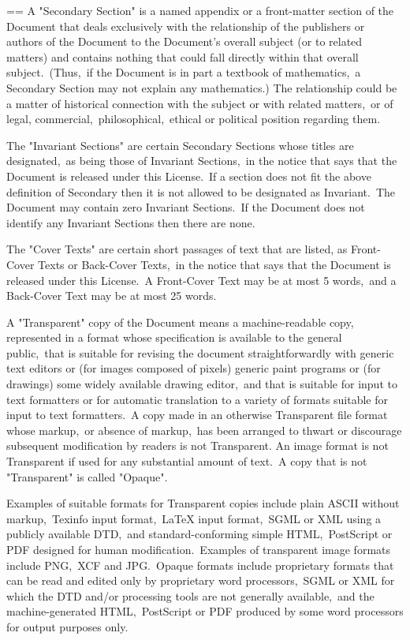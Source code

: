 \documentclass{book}
\makeatletter
\newenvironment{Texinfopreformatted}{%
  \par\GNUTobeylines\obeyspaces\frenchspacing\parskip=\z@\parindent=\z@}{}
{\catcode`\^^M=13 \gdef\GNUTobeylines{\catcode`\^^M=13 \def^^M{\null\par}}}
\newenvironment{Texinfoindented}{\begin{list}{}{}\item\relax}{\end{list}}
\renewcommand{\_}{\Texinfounderscore\discretionary{}{}{}}
\makeatother
\begin{document}
\begin{Texinfoindented}
\begin{Texinfopreformatted}
A "Secondary Section" is a named appendix or a front-matter section of
the Document that deals exclusively with the relationship of the
publishers or authors of the Document to the Document's overall
subject (or to related matters) and contains nothing that could fall
directly within that overall subject.\  (Thus,\ if the Document is in
part a textbook of mathematics,\ a Secondary Section may not explain
any mathematics.)  The relationship could be a matter of historical
connection with the subject or with related matters,\ or of legal,
commercial,\ philosophical,\ ethical or political position regarding
them.

The "Invariant Sections" are certain Secondary Sections whose titles
are designated,\ as being those of Invariant Sections,\ in the notice
that says that the Document is released under this License.\  If a
section does not fit the above definition of Secondary then it is not
allowed to be designated as Invariant.\  The Document may contain zero
Invariant Sections.\  If the Document does not identify any Invariant
Sections then there are none.

The "Cover Texts" are certain short passages of text that are listed,
as Front-Cover Texts or Back-Cover Texts,\ in the notice that says that
the Document is released under this License.\  A Front-Cover Text may
be at most 5 words,\ and a Back-Cover Text may be at most 25 words.

A "Transparent" copy of the Document means a machine-readable copy,
represented in a format whose specification is available to the
general public,\ that is suitable for revising the document
straightforwardly with generic text editors or (for images composed of
pixels) generic paint programs or (for drawings) some widely available
drawing editor,\ and that is suitable for input to text formatters or
for automatic translation to a variety of formats suitable for input
to text formatters.\  A copy made in an otherwise Transparent file
format whose markup,\ or absence of markup,\ has been arranged to thwart
or discourage subsequent modification by readers is not Transparent.
An image format is not Transparent if used for any substantial amount
of text.\  A copy that is not "Transparent" is called "Opaque".

Examples of suitable formats for Transparent copies include plain
ASCII without markup,\ Texinfo input format,\ LaTeX input format,\ SGML
or XML using a publicly available DTD,\ and standard-conforming simple
HTML,\ PostScript or PDF designed for human modification.\  Examples of
transparent image formats include PNG,\ XCF and JPG.\  Opaque formats
include proprietary formats that can be read and edited only by
proprietary word processors,\ SGML or XML for which the DTD and/or
processing tools are not generally available,\ and the
machine-generated HTML,\ PostScript or PDF produced by some word
processors for output purposes only.


\end{Texinfopreformatted}
\end{Texinfoindented}
\end{document}
